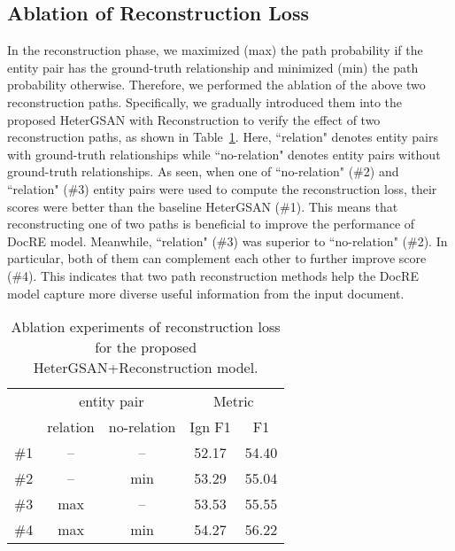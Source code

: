\documentclass[letterpaper]{article} \usepackage{aaai21}  \usepackage{times}  \usepackage{helvet} \usepackage{courier}  \usepackage[hyphens]{url}  \usepackage{graphicx} \urlstyle{rm} \def\UrlFont{\rm}  \usepackage{natbib}  \usepackage{caption} \frenchspacing  \setlength{\pdfpagewidth}{8.5in}  \setlength{\pdfpageheight}{11in}  \usepackage{amsmath}
\begin{document}
\subsection{Ablation of Reconstruction Loss}
In the reconstruction phase, we maximized (max) the path probability if the entity pair has the ground-truth relationship and minimized (min) the path probability otherwise.
Therefore, we performed the ablation of the above two reconstruction paths.
Specifically, we gradually introduced them into the proposed HeterGSAN with Reconstruction to verify the effect of two reconstruction paths, as shown in Table~\ref{tab4:pathablation}.
Here, ``relation" denotes entity pairs with ground-truth relationships while ``no-relation" denotes entity pairs without ground-truth relationships.
As seen, when one of ``no-relation" (\#2) and ``relation" (\#3) entity pairs were used to compute the reconstruction loss, their  scores were better than the baseline HeterGSAN (\#1).
This means that reconstructing one of two paths is beneficial to improve the performance of DocRE model.
Meanwhile, ``relation" (\#3) was superior to ``no-relation" (\#2).
In particular, both of them can complement each other to further improve  score (\#4).
This indicates that two path reconstruction methods help the DocRE model capture more diverse useful information from the input document.
\begin{table}[h]
	\begin{center}
		\begin{tabular}{c|cc|c|c}
& \multicolumn{2}{c}{entity pair} & \multicolumn{2}{c}{Metric} \\ \cline{2-5}
			& relation        & no-relation          & Ign F1        & F1     \\ \hline
			\#1 & --              & --      &  52.17    & 54.40    \\
			\#2 & --              & min     &  53.29    & 55.04    \\
			\#3 & max             & --      &  53.53    & 55.55    \\
			\#4 & max             & min     &  54.27    & 56.22    \\ \end{tabular}
	\end{center}
	\caption{\label{tab4:pathablation}Ablation experiments of reconstruction loss for the proposed HeterGSAN+Reconstruction model.}
\end{table}
\end{document}
